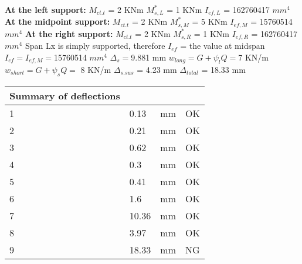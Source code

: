 \documentclass{article}%
\begin{document}
%
\newline%
\newline%
%
\textbf{At the left support:}%
\newline%
\newline%
%
$M_{ct.t}$ = 2 KNm%
\newline%
%
$M_{s,L}^{*}$ = 1 KNm%
\newline%
%
$I_{ef,L}$ = 162760417 $mm^{4}$%
\newline%
\newline%
%
\textbf{At the midpoint support:}%
\newline%
\newline%
%
$M_{ct.t}$ = 2 KNm%
\newline%
%
$M_{s,M}^{*}$ = 5 KNm%
\newline%
%
$I_{ef,M}$ = 15760514 $mm^{4}$%
\newline%
\newline%
%
\textbf{At the right support:}%
\newline%
\newline%
%
$M_{ct.t}$ = 2 KNm%
\newline%
%
$M_{s,R}^{*}$ = 1 KNm%
\newline%
%
$I_{ef,R}$ = 162760417 $mm^{4}$%
\newline%
\newline%
%
Span Lx is simply supported, therefore $I_{ef}$ = the value at midspan%
\newline%
\newline%
%
$I_{ef} = I_{ef,M} = $15760514 $ mm^{4}$%
\newline%
\newline%
%
$\Delta_{s} =$9.881 mm%
\newline%
\newline%
%
$w_{long} = G + \psi_{l}Q = $7 KN/m%
\newline%
%
$w_{short} = G + \psi_{s}Q = $ 8 KN/m%
\newline%
\newline%
%
$\Delta_{s.sus}$ = 4.23 mm%
\newline%
\newline%
%
$\Delta_{total}$ = 18.33 mm%
\newline%
\newline%
%
\begin{tabular}{llll}%
Summary of deflections&&&\\%
\hline%
1&0.13& mm&OK\\%
2&0.21& mm&OK\\%
3&0.62& mm&OK\\%
4&0.3& mm&OK\\%
5&0.41& mm&OK\\%
6&1.6& mm&OK\\%
7&10.36& mm&OK\\%
8&3.97& mm&OK\\%
9&18.33& mm&NG\\%
\end{tabular}%
\end{document}

